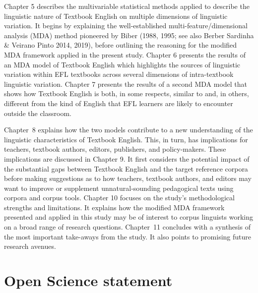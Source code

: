 \documentclass[
  letterpaper,
  DIV=11,
  numbers=noendperiod]{scrreprt}
\begin{document}
Chapter 5 describes the multivariable statistical methods applied to
describe the linguistic nature of Textbook English on multiple
dimensions of linguistic variation. It begins by explaining the
well-established multi-feature/dimensional analysis (MDA) method
pioneered by Biber (1988, 1995; see also Berber Sardinha \& Veirano
Pinto 2014, 2019), before outlining the reasoning for the modified MDA
framework applied in the present study. Chapter 6 presents the results
of an MDA model of Textbook English which highlights the sources of
linguistic variation within EFL textbooks across several dimensions of
intra-textbook linguistic variation. Chapter 7 presents the results of a
second MDA model that shows how Textbook English is both, in some
respects, similar to and, in others, different from the kind of English
that EFL learners are likely to encounter outside the classroom.

Chapter~8 explains how the two models contribute to a new understanding
of the linguistic characteristics of Textbook English. This, in turn,
has implications for teachers, textbook authors, editors, publishers,
and policy-makers. These implications are discussed in Chapter 9. It
first considers the potential impact of the substantial gaps between
Textbook English and the target reference corpora before making
suggestions as to how teachers, textbook authors, and editors may want
to improve or supplement unnatural‑sounding pedagogical texts using
corpora and corpus tools. Chapter 10 focuses on the study's
methodological strengths and limitations. It explains how the modified
MDA framework presented and applied in this study may be of interest to
corpus linguists working on a broad range of research questions.
Chapter~11 concludes with a synthesis of the most important take-aways
from the study. It also points to promising future research avenues.


\chapter{Open Science statement}\label{open-science-statement}
\end{document}
